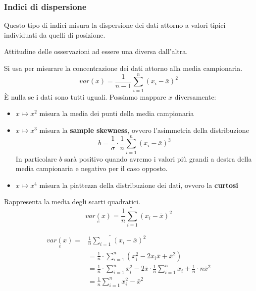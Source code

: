 \subsubsection{Indici di dispersione}
Questo tipo di indici misura la dispersione dei dati attorno a valori tipici individuati da quelli di posizione.

\begin{definition}[Variabilità]
	Attitudine delle osservazioni ad essere una diversa dall'altra.
\end{definition}

\begin{definition}
	Si usa per misurare la concentrazione dei dati attorno alla media campionaria.
	\begin{equation}
		var(x) = \frac{1}{n-1}\sum_{i=1}^{n}(x_i - \bar{x})^2
	\end{equation}
	È nulla se i dati sono tutti uguali. Possiamo mappare $x$ diversamente:
	\begin{itemize}
		\item $x \mapsto x^2$ misura la media dei punti della media campionaria
		\item $x \mapsto x^3$ misura la \textbf{sample skewness}, ovvero l'asimmetria della distribuzione
		\begin{equation}
			b = \frac{1}{\sigma} \cdot \frac{1}{n} \sum_{i=1}^{n}(x_i-\bar{x})^3
		\end{equation}
		In particolare $b$ sarà positivo quando avremo i valori più grandi a destra della media campionaria e negativo per il caso opposto.
		\item $x \mapsto x^4$ misura la piattezza della distribuzione dei dati, ovvero la \textbf{curtosi}
	\end{itemize}
\end{definition}

\begin{definition}
	Rappresenta la media degli scarti quadratici.
	\begin{equation}
		\underset{e}{var(x)} = \frac{1}{n} \tilde{\sum_{i=1}} (x_i - \bar{x})^2
	\end{equation}
\end{definition}

\begin{demostration}
	\begin{align}
		\underset{e}{var(x)} = & \frac{1}{n} \tilde{\sum_{i=1}} (x_i - \bar{x})^2 \\
		& = \frac{1}{n} \cdot \sum_{i=1}^{n} (x_i^2 -2x_i \bar{x}+\bar{x}^2) \\
		& = \frac{1}{n} \cdot \sum_{i=1}^{n}x_i^2 -2\bar{x}\cdot\frac{1}{n} \sum_{i=1}^{n} x_i + \frac{1}{n}\cdot n \bar{x}^2\\
		& = \frac{1}{n} \sum_{i=1}^{n} x_i^2 - \bar{x}^2
	\end{align}
\end{demostration}

